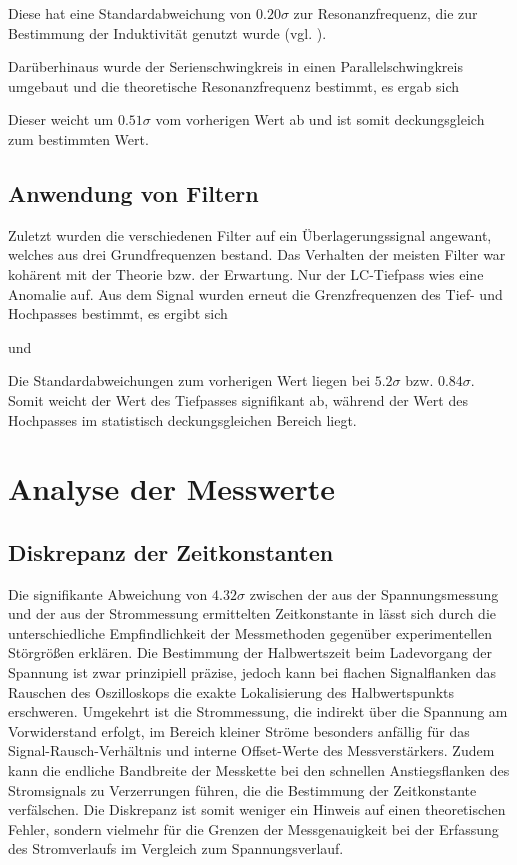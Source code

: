 Diese hat eine Standardabweichung von $0.20\sigma$ zur Resonanzfrequenz, die zur Bestimmung der Induktivität genutzt wurde (vgl. ).

Darüberhinaus wurde der Serienschwingkreis in einen Parallelschwingkreis umgebaut und die theoretische Resonanzfrequenz bestimmt, es ergab sich 

Dieser weicht um $0.51\sigma$ vom vorherigen Wert ab und ist somit deckungsgleich zum bestimmten Wert.

\subsection*{Anwendung von Filtern}
Zuletzt wurden die verschiedenen Filter auf ein Überlagerungssignal angewant, welches aus drei Grundfrequenzen bestand. Das Verhalten der meisten Filter war kohärent mit der Theorie bzw. der Erwartung. Nur der LC-Tiefpass wies eine Anomalie auf.
Aus dem Signal wurden erneut die Grenzfrequenzen des Tief- und Hochpasses bestimmt, es ergibt sich


und 


Die Standardabweichungen zum vorherigen Wert liegen bei $5.2\sigma$ bzw. $0.84\sigma$. Somit weicht der Wert des Tiefpasses signifikant ab, während der Wert des Hochpasses im statistisch deckungsgleichen Bereich liegt.

\section{Analyse der Messwerte}
\label{sec:Analyse}

\subsection*{Diskrepanz der Zeitkonstanten}
Die signifikante Abweichung von $4.32\sigma$ zwischen der aus der Spannungsmessung und der aus der Strommessung ermittelten Zeitkonstante in  lässt sich durch die unterschiedliche Empfindlichkeit der Messmethoden gegenüber experimentellen Störgrößen erklären. Die Bestimmung der Halbwertszeit beim Ladevorgang der Spannung ist zwar prinzipiell präzise, jedoch kann bei flachen Signalflanken das Rauschen des Oszilloskops die exakte Lokalisierung des Halbwertspunkts erschweren. Umgekehrt ist die Strommessung, die indirekt über die Spannung am Vorwiderstand erfolgt, im Bereich kleiner Ströme besonders anfällig für das Signal-Rausch-Verhältnis und interne Offset-Werte des Messverstärkers. Zudem kann die endliche Bandbreite der Messkette bei den schnellen Anstiegsflanken des Stromsignals zu Verzerrungen führen, die die Bestimmung der Zeitkonstante verfälschen. Die Diskrepanz ist somit weniger ein Hinweis auf einen theoretischen Fehler, sondern vielmehr für die Grenzen der Messgenauigkeit bei der Erfassung des Stromverlaufs im Vergleich zum Spannungsverlauf.

